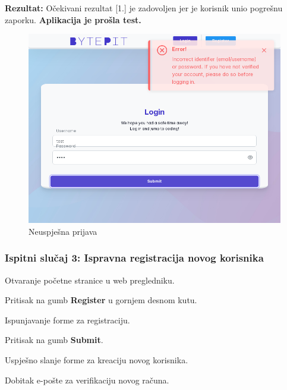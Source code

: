 			\noindent \textbf{Rezultat:} Očekivani rezultat [1.] je zadovoljen jer je korisnik unio pogrešnu zaporku. \textbf{Aplikacija je prošla test.}
			
			\begin{figure}[H]
				\includegraphics[scale=0.50]{slike/failed_login.PNG}
				\centering
				\caption{Neuspješna prijava}
				\label{fig:failed_login}
			\end{figure}
			
			\eject
			
			\subsubsection{Ispitni slučaj 3: Ispravna registracija novog korisnika}
			
			
			\begin{packed_enum}
				
				\item  Otvaranje početne stranice u web pregledniku.
				\item  Pritisak na gumb \textbf{Register} u gornjem desnom kutu.
				\item  Ispunjavanje forme za registraciju.
				\item  Pritisak na gumb \textbf{Submit}. 
				
			\end{packed_enum}
			
			\begin{packed_enum}
				
				\item  Uspješno slanje forme za kreaciju novog korisnika.
				\item  Dobitak e-pošte za verifikaciju novog računa.
				
			\end{packed_enum}
			

